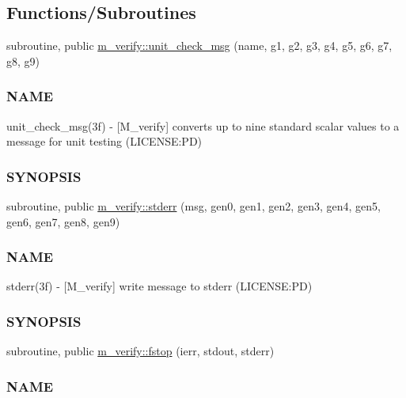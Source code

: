 \subsection*{Functions/\+Subroutines}
\begin{DoxyCompactItemize}
\item 
subroutine, public \mbox{\hyperlink{namespacem__verify_a74ea8b4574606c4f72e97b115375fc9b}{m\+\_\+verify\+::unit\+\_\+check\+\_\+msg}} (name, g1, g2, g3, g4, g5, g6, g7, g8, g9)
\begin{DoxyCompactList}\small\item\em \subsubsection*{N\+A\+ME}

unit\+\_\+check\+\_\+msg(3f) -\/ \mbox{[}M\+\_\+verify\mbox{]} converts up to nine standard scalar values to a message for unit testing (L\+I\+C\+E\+N\+SE\+:PD) \subsubsection*{S\+Y\+N\+O\+P\+S\+IS}\end{DoxyCompactList}\item 
subroutine, public \mbox{\hyperlink{namespacem__verify_a41f795f932767c97b5ef481a694f4f84}{m\+\_\+verify\+::stderr}} (msg, gen0, gen1, gen2, gen3, gen4, gen5, gen6, gen7, gen8, gen9)
\begin{DoxyCompactList}\small\item\em \subsubsection*{N\+A\+ME}

stderr(3f) -\/ \mbox{[}M\+\_\+verify\mbox{]} write message to stderr (L\+I\+C\+E\+N\+SE\+:PD) \subsubsection*{S\+Y\+N\+O\+P\+S\+IS}\end{DoxyCompactList}\item 
subroutine, public \mbox{\hyperlink{namespacem__verify_a2695833d468118d68918d6aeabab6d0b}{m\+\_\+verify\+::fstop}} (ierr, stdout, stderr)
\begin{DoxyCompactList}\small\item\em \subsubsection*{N\+A\+ME}


\end{DoxyCompactList}
\end{DoxyCompactItemize}
